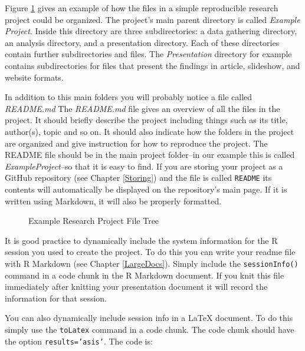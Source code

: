 {Figure \ref{ExampleTree} gives an example of how the files in a simple reproducible research project could be organized. The project's main parent directory is called {\emph{Example Project}}. Inside this directory are three subdirectories: a data gathering directory, an analysis directory, and a presentation directory. Each of these directories contain further subdirectories and files. The {\emph{Presentation}} directory for example contains subdirectories for files that present the findings in article, slideshow, and website formats.

In addition to this main folders you will probably notice a file called {\emph{README.md}} The {\emph{README.md}} file gives an overview of all the files in the project. It should briefly describe the project including things such as its title, author(s), topic and so on. It should also indicate how the folders in the project are organized and give instruction for how to reproduce the project. The README file should be in the main project folder--in our example this is called {\emph{ExampleProject}}--so that it is easy to find. If you are storing your project as a GitHub repository (see Chapter \ref{Storing}) and the file is called \texttt{README} its contents will automatically be displayed on the repository's main page. If it is written using Markdown, it will also be properly formatted.

\thispagestyle{plain}
\begin{landscape}
\begin{figure}[th!]
    \caption{Example Research Project File Tree}
    \label{ExampleTree}
    \begin{center}
    
    
    \end{center}
\end{figure}
\end{landscape}

It is good practice to dynamically include the system information for the R session you used to create the project. To do this you can write your readme file with R Markdown (see Chapter \ref{LargeDocs}). Simply include the \texttt{sessionInfo()} command in a code chunk in the R Markdown document. If you knit this file immediately after knitting your presentation document it will record the information for that session.

\noindent You can also dynamically include session info in a LaTeX document. To do this simply use the {\tt{toLatex}} command in a code chunk. The code chunk should have the option \texttt{results='asis'}. The code is:

}
